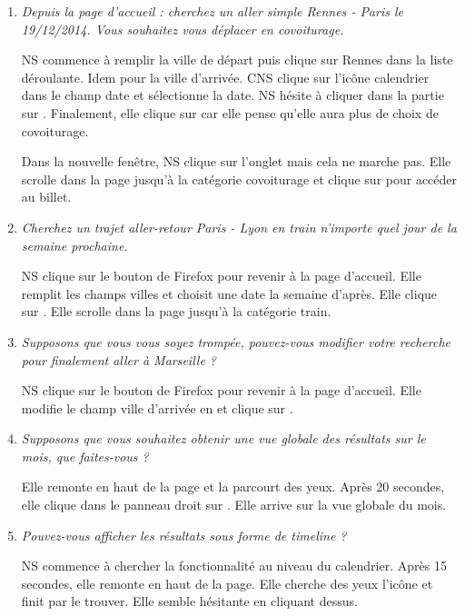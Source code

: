 \begin{enumerate}
\item \textit{Depuis la page d'accueil : cherchez un aller simple Rennes - Paris le 19/12/2014. Vous souhaitez vous d\'{e}placer en covoiturage.}

NS commence \`{a} remplir la ville de d\'{e}part puis clique sur Rennes dans la liste d\'{e}roulante. Idem pour la ville d'arriv\'{e}e.
CNS clique sur l'ic\^{o}ne calendrier dans le champ date et s\'{e}lectionne la date.
NS h\'{e}site \`{a} cliquer dans la partie  sur . Finalement, elle clique sur  car elle pense qu'elle aura plus de choix de covoiturage.

Dans la nouvelle fen\^{e}tre, NS clique sur l'onglet  mais cela ne marche pas.
Elle scrolle dans la page jusqu'\`{a} la cat\'{e}gorie covoiturage et clique sur  pour acc\'{e}der au billet.



\item \textit{Cherchez un trajet aller-retour Paris - Lyon en train n'importe quel jour de la semaine prochaine.} 

NS clique sur le bouton  de Firefox pour revenir \`{a} la page d'accueil.
Elle remplit les champs villes et choisit une date la semaine d'apr\`{e}s. Elle clique sur .
Elle scrolle dans la page jusqu'\`{a} la cat\'{e}gorie train.


\item \textit{Supposons que vous vous soyez tromp\'{e}e, pouvez-vous modifier votre recherche pour finalement aller \`{a} Marseille ?}

NS clique sur le bouton  de Firefox pour revenir \`{a} la page d'accueil.
Elle modifie le champ ville d'arriv\'{e}e en  et clique sur .


\item \textit{Supposons que vous souhaitez obtenir une vue globale des r\'{e}sultats sur le mois, que faites-vous ?}

Elle remonte en haut de la page et la parcourt des yeux. Apr\`{e}s 20 secondes, elle clique dans le panneau droit sur . Elle arrive sur la vue globale du mois.

\item \textit{Pouvez-vous afficher les r\'{e}sultats sous forme de timeline ?}

NS commence \`{a} chercher la fonctionnalit\'{e} au niveau du calendrier. Apr\`{e}s 15 secondes, elle remonte en haut de la page. Elle cherche des yeux l'ic\^{o}ne  et finit par le trouver. Elle semble h\'{e}sitante en cliquant dessus.



\end{enumerate}
